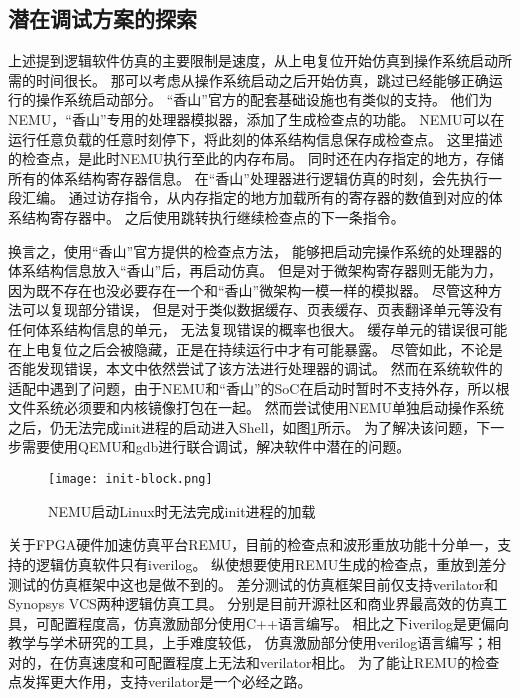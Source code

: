 \subsection{潜在调试方案的探索}

上述提到逻辑软件仿真的主要限制是速度，从上电复位开始仿真到操作系统启动所需的时间很长。
那可以考虑从操作系统启动之后开始仿真，跳过已经能够正确运行的操作系统启动部分。
“香山”官方的配套基础设施也有类似的支持。
他们为NEMU，“香山”专用的处理器模拟器，添加了生成检查点的功能。
NEMU可以在运行任意负载的任意时刻停下，将此刻的体系结构信息保存成检查点。
这里描述的检查点，是此时NEMU执行至此的内存布局。
同时还在内存指定的地方，存储所有的体系结构寄存器信息。
在“香山”处理器进行逻辑仿真的时刻，会先执行一段汇编。
通过访存指令，从内存指定的地方加载所有的寄存器的数值到对应的体系结构寄存器中。
之后使用跳转执行继续检查点的下一条指令。

换言之，使用“香山”官方提供的检查点方法，
能够把启动完操作系统的处理器的体系结构信息放入“香山”后，再启动仿真。
但是对于微架构寄存器则无能为力，
因为既不存在也没必要存在一个和“香山”微架构一模一样的模拟器。
尽管这种方法可以复现部分错误，
但是对于类似数据缓存、页表缓存、页表翻译单元等没有任何体系结构信息的单元，
无法复现错误的概率也很大。
缓存单元的错误很可能在上电复位之后会被隐藏，正是在持续运行中才有可能暴露。
尽管如此，不论是否能发现错误，本文中依然尝试了该方法进行处理器的调试。
然而在系统软件的适配中遇到了问题，由于NEMU和“香山”的SoC在启动时暂时不支持外存，所以根文件系统必须要和内核镜像打包在一起。
然而尝试使用NEMU单独启动操作系统之后，仍无法完成init进程的启动进入Shell，如图\ref{fig:init-block}所示。
为了解决该问题，下一步需要使用QEMU和gdb进行联合调试，解决软件中潜在的问题。

\begin{figure}[htbp]
    \centering
    \texttt{[image: init-block.png]}
    \caption{NEMU启动Linux时无法完成init进程的加载}
    \label{fig:init-block}
\end{figure}

关于FPGA硬件加速仿真平台REMU，目前的检查点和波形重放功能十分单一，支持的逻辑仿真软件只有iverilog。
纵使想要使用REMU生成的检查点，重放到差分测试的仿真框架中这也是做不到的。
差分测试的仿真框架目前仅支持verilator和Synopsys VCS两种逻辑仿真工具。
分别是目前开源社区和商业界最高效的仿真工具，可配置程度高，仿真激励部分使用C++语言编写。
相比之下iverilog是更偏向教学与学术研究的工具，上手难度较低，
仿真激励部分使用verilog语言编写；相对的，在仿真速度和可配置程度上无法和verilator相比。
为了能让REMU的检查点发挥更大作用，支持verilator是一个必经之路。


